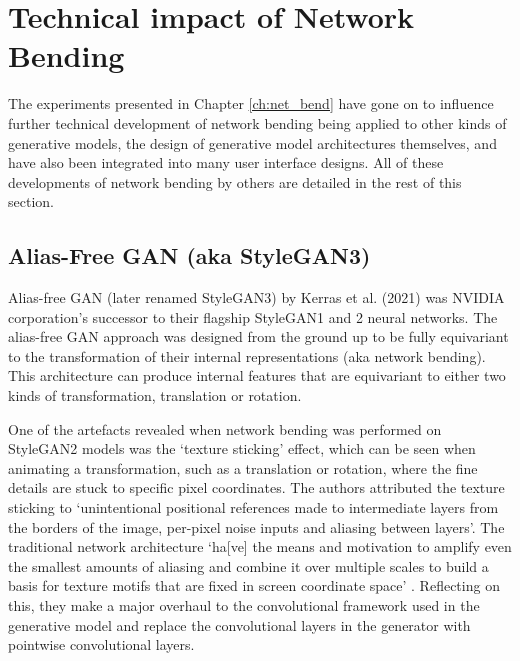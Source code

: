 \section{Technical impact of Network Bending}
\label{c7:sec:net-bend-impact}

The experiments presented in Chapter \ref{ch:net_bend} have gone on to influence further technical development of network bending being applied to other kinds of generative models, the design of generative model architectures themselves, and have also been integrated into many user interface designs. All of these developments of network bending by others are detailed in the rest of this section.

 \subsection{Alias-Free GAN (aka StyleGAN3)}

 Alias-free GAN (later renamed StyleGAN3) by Kerras et al. (2021) was NVIDIA corporation's successor to their flagship StyleGAN1 and 2 neural networks. 
 The alias-free GAN approach was designed from the ground up to be fully equivariant to the transformation of their internal representations (aka network bending). 
 This architecture can produce internal features that are equivariant to either two kinds of transformation, translation or rotation. 

 One of the artefacts revealed when network bending was performed on StyleGAN2 models was the ‘texture sticking’ effect, which can be seen when animating a transformation, such as a translation or rotation, where the fine details are stuck to specific pixel coordinates. 
 The authors attributed the texture sticking to `unintentional positional references made to intermediate layers from the borders of the image, per-pixel noise inputs and aliasing between layers'. 
 The traditional network architecture `ha[ve] the means and motivation to amplify even the smallest amounts of aliasing and combine it over multiple scales to build a basis for texture motifs that are fixed in screen coordinate space' \citep{karras2021alias}.
 Reflecting on this, they make a major overhaul to the convolutional framework used in the generative model and replace the convolutional layers in the generator with pointwise convolutional layers.

